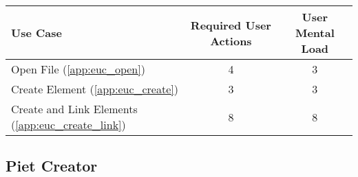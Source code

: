 
\begin{tabularx}{\textwidth}{Xcc}
\textbf{Use Case} & \textbf{Required User Actions} & \textbf{User Mental Load}\\
\hline
Open File (\ref{app:euc_open})                       & 4 & 3 \\
Create Element (\ref{app:euc_create})                & 3 & 3 \\
Create and Link Elements (\ref{app:euc_create_link}) & 8 & 8
\end{tabularx}

\subsection*{Piet Creator}




